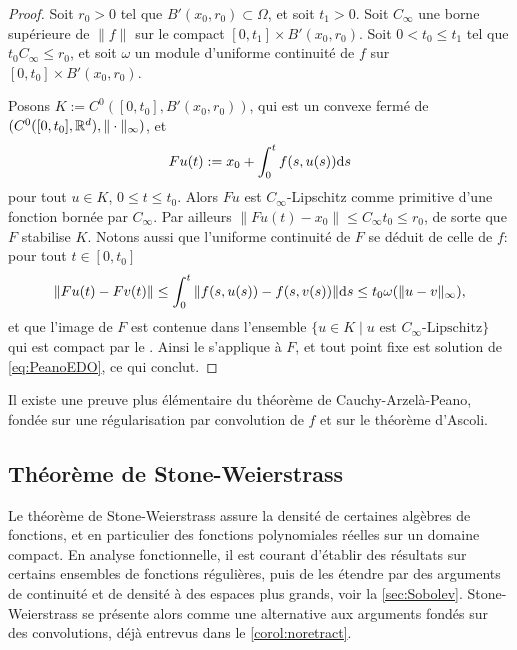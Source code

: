 \begin{proof}
	Soit $r_0>0$ tel que $B'(x_0,r_0) \subset \Omega$, et soit $t_1>0$. Soit $C_\infty$ une borne supérieure de $\|f\|$ sur le compact $[0,t_1] \times B'(x_0,r_0)$. Soit $0<t_0\leq t_1$ tel que $t_0 C_\infty \leq r_0$, et soit $\omega$ un module d'uniforme continuité de $f$ sur $[0,t_0] \times B'(x_0,r_0)$.
	
	Posons $K := C^0([0,t_0],B'(x_0,r_0))$,  qui est un convexe fermé de $(C^0([0,t_0],\mathbb{R}^d), \|\cdot\|_\infty)$, et 
	\begin{equation*}
	F u(t) := x_0 + \int_0^t f(s,u(s)) \mathrm{d} s	
	\end{equation*}
	pour tout $u \in K$, $0 \leq t \leq t_0$. 
	Alors $F u$ est $C_\infty$-Lipschitz comme primitive d'une fonction bornée par $C_\infty$. Par ailleurs $\|Fu(t)-x_0\| \leq C_\infty t_0 \leq r_0$, de sorte que $F$ stabilise $K$. Notons aussi que l'uniforme continuité de $F$ se déduit de celle de $f$: pour  tout $t \in [0,t_0]$
	\begin{equation*}
		\|Fu(t) - Fv(t)\| \leq \int_0^t \|f(s,u(s)) - f(s,v(s))\|\mathrm{d} s \leq t_0 \omega( \|u-v\|_\infty),
	\end{equation*}
	et que l'image de $F$ est contenue dans l'ensemble $\{u \in K\mid u \text{ est $C_\infty$-Lipschitz}\}$ qui est compact par le . Ainsi le  s'applique à $F$, et tout point fixe est solution de \eqref{eq:PeanoEDO}, ce qui conclut. 
\end{proof}

\begin{remark} %
\label{rem:preuveCauchyPeano}
	Il existe une preuve plus élémentaire du théorème de Cauchy-Arzelà-Peano, fondée sur une régularisation par convolution de $f$ et sur le théorème d'Ascoli.
\end{remark}


\subsection{Théorème de Stone-Weierstrass}
\label{subsec:StoneWeierstrass}

Le théorème de Stone-Weierstrass assure la densité de certaines algèbres de fonctions, et en particulier des fonctions polynomiales réelles sur un domaine compact. En analyse fonctionnelle, il est courant d'établir des résultats sur certains ensembles de fonctions régulières, puis de les étendre par des arguments de continuité et de densité à des espaces plus grands, voir la \cref{sec:Sobolev}. Stone-Weierstrass se présente alors comme une alternative aux arguments fondés sur des convolutions, déjà entrevus dans le \cref{corol:noretract}. 

